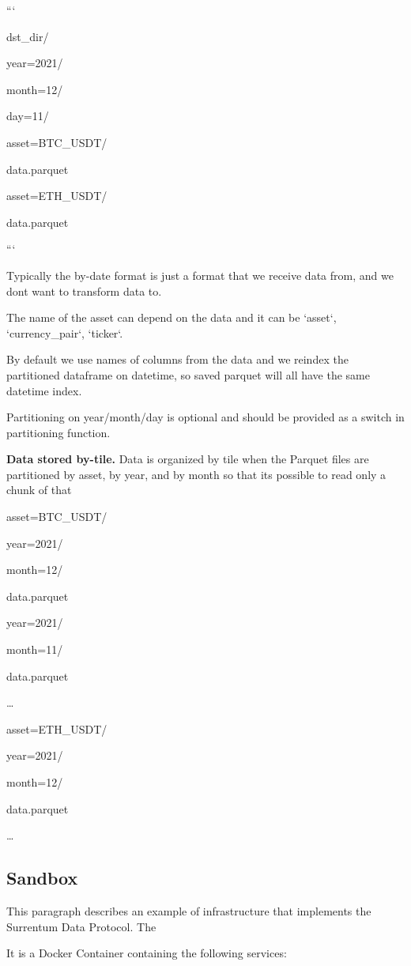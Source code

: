 \documentclass[11pt, reqno]{amsart}
\begin{document}
```

dst\_dir/

year=2021/

month=12/

day=11/

asset=BTC\_USDT/

data.parquet

asset=ETH\_USDT/

data.parquet

```

Typically the by-date format is just a format that we receive data from,
and we don\textquotesingle t want to transform data to.

The name of the asset can depend on the data and it can be `asset`,
`currency\_pair`, `ticker`.

By default we use names of columns from the data and we reindex the
partitioned dataframe on datetime, so saved parquet will all have the
same datetime index.

Partitioning on year/month/day is optional and should be provided as a
switch in partitioning function.

\textbf{Data stored by-tile.} Data is organized by tile when the Parquet
files are partitioned by asset, by year, and by month so that
it\textquotesingle s possible to read only a chunk of that

asset=BTC\_USDT/

year=2021/

month=12/

data.parquet

year=2021/

month=11/

data.parquet

\ldots{}

asset=ETH\_USDT/

year=2021/

month=12/

data.parquet

\ldots{}

\subsection{Sandbox}

This paragraph describes an example of infrastructure that implements
the Surrentum Data Protocol. The

It is a Docker Container containing the following services:
\end{document}
